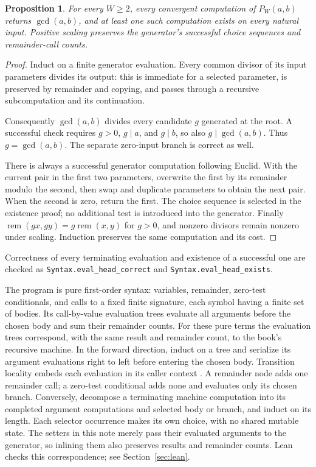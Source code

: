 \documentclass[11pt]{article}
\newtheorem{proposition}[theorem]{Proposition}
\newcommand{\rem}{\operatorname{rem}}
\newcommand{\lean}[1]{\nolinkurl{#1}}
\begin{document}
\begin{proposition}
For every $W\geq2$, every convergent computation of $P_W(a,b)$ returns
$\gcd(a,b)$, and at least one such computation exists on every natural input.
Positive scaling preserves the generator's successful choice sequences and
remainder-call counts.
\end{proposition}
\begin{proof}
Induct on a finite generator evaluation. Every common divisor of its input
parameters divides its output: this is immediate for a selected parameter,
is preserved by remainder and copying, and passes through a recursive
subcomputation and its continuation.

Consequently $\gcd(a,b)$ divides every candidate $g$ generated at the root.
A successful check requires $g>0$, $g\mid a$, and $g\mid b$, so also
$g\mid\gcd(a,b)$. Thus $g=\gcd(a,b)$.
The separate zero-input branch is correct as well.

There is always a successful generator computation following Euclid.
With the current pair in the first two parameters, overwrite the first by
its remainder modulo the second, then swap and duplicate parameters to obtain
the next pair. When the second is zero, return the first.
The choice sequence is selected in the existence proof; no additional test
is introduced into the generator.
Finally $\rem(gx,gy)=g\rem(x,y)$ for $g>0$, and nonzero divisors remain
nonzero under scaling. Induction preserves the same computation and its cost.
\end{proof}
Correctness of every terminating evaluation and existence of a successful one
are checked as \lean{Syntax.eval_head_correct} and \lean{Syntax.eval_head_exists}.

The program is pure first-order syntax: variables, remainder, zero-test
conditionals, and calls to a fixed finite signature, each symbol having a
finite set of bodies. Its call-by-value evaluation trees evaluate all
arguments before the chosen body and sum their remainder counts.
For these pure terms the evaluation trees correspond, with the same result
and remainder count, to the book's recursive machine. In the forward direction,
induct on a tree and serialize its argument evaluations right to left before
entering the chosen body. Transition locality embeds each evaluation in its
caller context \cite[Table~1 and Lemma~2D.1, pp.~75--76]{book}. A remainder
node adds one remainder call; a zero-test conditional adds none and evaluates
only its chosen branch. Conversely, decompose a terminating machine computation
into its completed argument computations and selected body or branch, and
induct on its length. Each selector occurrence makes its own choice, with no
shared mutable state. The setters in this note merely pass their evaluated
arguments to the generator, so inlining them also preserves results and
remainder counts. Lean checks this correspondence; see Section~\ref{sec:lean}.
\end{document}
